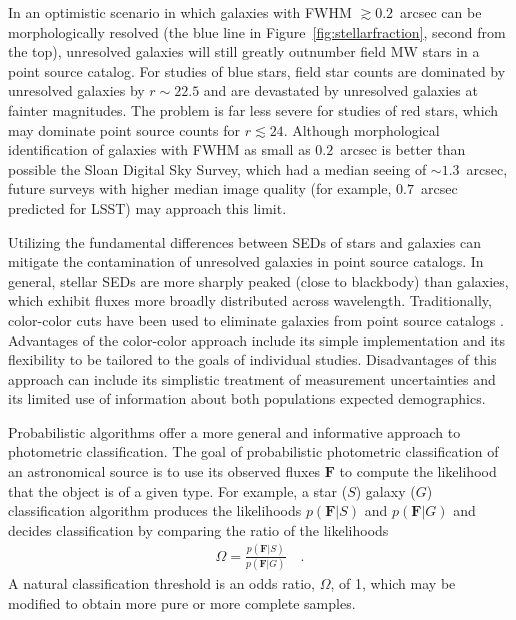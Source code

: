 \documentclass[12pt,preprint]{aastex}
\newcommand{\datavector}[1]{\boldsymbol{#1}}
\begin{document}
In an optimistic scenario in which galaxies with FWHM $\gtrsim 0.2$~arcsec can
be morphologically resolved (the blue line in
Figure~\ref{fig:stellarfraction}, second from the top), unresolved
galaxies will still greatly outnumber field MW stars in a point source
catalog.  For studies of blue stars, field star counts are dominated
by unresolved galaxies by $r\sim22.5$ and are devastated by unresolved
galaxies at fainter magnitudes. The problem is far less severe for
studies of red stars, which may dominate point source counts for
$r\lesssim24$. Although morphological identification of galaxies with
FWHM as small as $0.2$~arcsec is better than possible the Sloan Digital Sky
Survey, which had a median seeing of $\sim1.3$~arcsec, future surveys with
higher median image quality (for example, $0.7$~arcsec predicted for LSST) may
approach this limit.

Utilizing the fundamental differences between SEDs of stars and
galaxies can mitigate the contamination of unresolved galaxies in
point source catalogs.  In general, stellar SEDs are more sharply
peaked (close to blackbody) than galaxies, which exhibit fluxes more
broadly distributed across wavelength.  Traditionally, color-color
cuts have been used to eliminate galaxies from point source catalogs
\citep[e.g.,][]{gould92a,reitzel98a,daddi04a}.  Advantages of the
color-color approach include its simple implementation and its
flexibility to be tailored to the goals of individual studies.
Disadvantages of this approach can include its simplistic treatment of
measurement uncertainties and its limited use of information about
both populations expected demographics.

Probabilistic algorithms offer a more general and informative approach
to photometric classification.  The goal of probabilistic photometric
classification of an astronomical source is to use its observed fluxes
$\datavector{F}$ to compute the likelihood that the object is of a
given type.  For example, a star ($S$) galaxy ($G$) classification
algorithm produces the likelihoods $p(\datavector{F}|S)$ and
$p(\datavector{F}|G)$ and decides classification by comparing the
ratio of the likelihoods
\begin{eqnarray}\displaystyle
\Omega = \frac{p(\datavector{F}|S)}{p(\datavector{F}|G)} 
\quad .
\label{eqn:oddsratio}
\end{eqnarray}
A natural classification threshold is an odds ratio,
$\Omega$, of 1, which may be modified to obtain more pure or more
complete samples.
\end{document}
